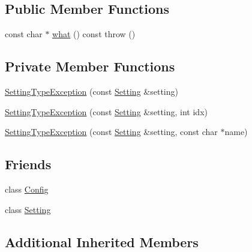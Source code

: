 \subsection*{Public Member Functions}
\begin{DoxyCompactItemize}
\item 
const char $\ast$ \hyperlink{classlibconfig_1_1SettingTypeException_a50c015f8011c3ffa3dce6a4a25072ec7}{what} () const   throw ()
\end{DoxyCompactItemize}
\subsection*{Private Member Functions}
\begin{DoxyCompactItemize}
\item 
\hyperlink{classlibconfig_1_1SettingTypeException_acd8ebc4a99bbddb806e87438f6ad3c34}{Setting\-Type\-Exception} (const \hyperlink{classlibconfig_1_1Setting}{Setting} \&setting)
\item 
\hyperlink{classlibconfig_1_1SettingTypeException_a2ce01f74b4eda694117444b284fd0a17}{Setting\-Type\-Exception} (const \hyperlink{classlibconfig_1_1Setting}{Setting} \&setting, int idx)
\item 
\hyperlink{classlibconfig_1_1SettingTypeException_ab694028ef0f14e141bff9f10564bc284}{Setting\-Type\-Exception} (const \hyperlink{classlibconfig_1_1Setting}{Setting} \&setting, const char $\ast$name)
\end{DoxyCompactItemize}
\subsection*{Friends}
\begin{DoxyCompactItemize}
\item 
class \hyperlink{classlibconfig_1_1SettingTypeException_ac3da7e21a05bf8852638db7e4dd1b81a}{Config}
\item 
class \hyperlink{classlibconfig_1_1SettingTypeException_a9aa0bc1c3d297cabf9a1848178294d38}{Setting}
\end{DoxyCompactItemize}
\subsection*{Additional Inherited Members}


